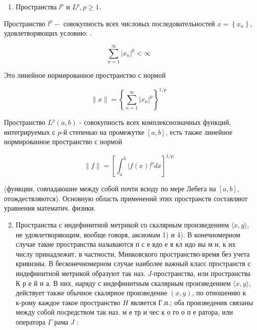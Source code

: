 \documentclass[10pt]{article}
\begin{document}
\begin{enumerate}

  \item Пространства $l^{p}$ и $L^{p}, p \geqslant 1$.

\end{enumerate}



Пространство $l^{p}-$ совокупность всех числовых последовательностей $x=\left\{x_{n}\right\}$, удовлетворяющих условию: .



\[

\sum_{n=1}^{\infty}\left|x_{n}\right|^{p}<\infty

\]



Это линейное нормированное пространство с нормой



\[

\|x\|=\left\{\sum_{n=1}^{\infty}\left|x_{n}\right|^{p}\right\}^{1 / p}

\]



Пространство $L^{p}(a, b)$ - совокупность всех комплекснозначных функций, интегрируемых с $p$-й степенью на промежутке $[a, b]$, есть также линейное нормированное пространство с нормой



\[

\|f\|=\left[\int_{a}^{b}|f(x)|^{p} d x\right]^{1 / p}

\]



(функции, совпадаюшие между собой почти всюду по мере Лебега на $[a, b]$, отождествляются). Основную область применений этих пространств составляют уравнения математич. физики.



\begin{enumerate}

  \setcounter{enumi}{1}

  \item Пространства с индефинитной метрикой со скалярным произведением $\langle x, y\rangle$, не удовлетворяющим, вообще говоря, аксиомам 1) и 4). В конечномерном случае такие пространства называются п с е вдо е в кл идо вы м и, к их числу принадлежит, в частности, Минковского пространство-время без учета кривизны. В бесконечномерном случае наиболее важный класс пространств с индефинитной метрикой образуют так наз. $J$-пространства, или пространства К р е й н а. В них, наряду с индефинитным скалярным произведением $\langle x, y\rangle$, действует также обычное скалярное произведение $(x, y)$, по отношению к к-рому каждое такое пространство $H$ является Г.п.; оба произведения связаны между собой посредством так наз. м е тр и чес к о го о п е ратора, или оператора $\Gamma$ рама $J$ :

\end{enumerate}
\end{document}
